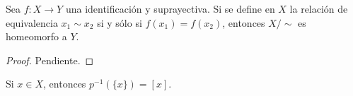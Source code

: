 

\begin{proposition}
Sea $f : X \longrightarrow Y$ una identificación y suprayectiva. Si se define en $X$ la relación de equivalencia $x_1 \sim x_2$ si y sólo si $f(x_1) = f(x_2)$, entonces $X/\sim$ es homeomorfo a $Y$.
\end{proposition}

\begin{proof}
Pendiente.
\end{proof}

\begin{remark}
Si $x \in X$, entonces $p^{-1}(\{ x \}) = [x]$.
\end{remark}
